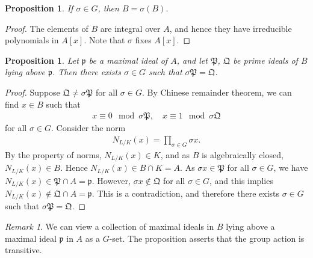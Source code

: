 \documentclass[12pt]{report}
\theoremstyle{plain}
\newtheorem{proposition}[theorem]{Proposition}
\theoremstyle{remark}
\newtheorem*{remark}{Remark}
\theoremstyle{definition}
\begin{document}
\begin{proposition}
    If $\sigma\in G$, then $B=\sigma(B)$.
\end{proposition}
\begin{proof}
    The elements of $B$ are integral over $A$, and hence they have irreducible polynomials in $A[x]$. Note that $\sigma$ fixes $A[x]$.
\end{proof}

\begin{proposition}
    Let $\mathfrak{p}$ be a maximal ideal of $A$, and let $\mathfrak{P}$, $\mathfrak{Q}$ be prime ideals of $B$ lying above $\mathfrak{p}$. Then there exists $\sigma\in G$ such that $\sigma\mathfrak{P}=\mathfrak{Q}$.
\end{proposition}
\begin{proof}
    Suppose $\mathfrak{Q}\neq \sigma\mathfrak{P}$ for all $\sigma\in G$. By Chinese remainder theorem, we can find $x\in B$ such that
    \begin{align*}
        x\equiv 0\mod \sigma\mathfrak{P},\quad x\equiv 1\mod \sigma\mathfrak{Q}
    \end{align*}
    for all $\sigma\in G$. Consider the norm
    \begin{align*}
        N_{L/K}(x) = \prod_{\sigma\in G}\sigma x.
    \end{align*}
    By the property of norms, $N_{L/K}(x)\in K$, and as $B$ is algebraically closed, $N_{L/K}(x)\in B$. Hence $N_{L/K}(x)\in B\cap K=A$. As $\sigma x\in \mathfrak{P}$ for all $\sigma\in G$, we have $N_{L/K}(x)\in \mathfrak{P}\cap A = \mathfrak{p}$. However, $\sigma x\not\in \mathfrak{Q}$ for all $\sigma\in G$, and this implies $N_{L/K}(x)\notin \mathfrak{Q}\cap A = \mathfrak{p}$. This is a contradiction, and therefore there exists $\sigma\in G$ such that $\sigma\mathfrak{P}=\mathfrak{Q}$. 
\end{proof}
\begin{remark}
    We can view a collection of maximal ideals in $B$ lying above a maximal ideal $\mathfrak{p}$ in $A$ as a $G$-set. The proposition asserts that the group action is transitive.
\end{remark}
\end{document}
